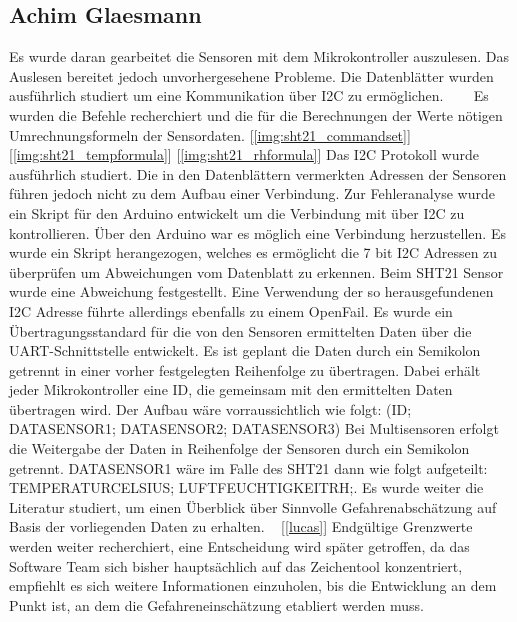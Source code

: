 \documentclass[]{article}
\begin{document}
\subsection{Achim Glaesmann}
Es wurde daran gearbeitet die Sensoren mit dem Mikrokontroller auszulesen. Das Auslesen bereitet jedoch unvorhergesehene Probleme. Die Datenblätter wurden ausführlich studiert um eine
Kommunikation über I2C zu ermöglichen. ~\cite{datasheetcss811}~\cite{datasheetscd41}~\cite{datasheetsht21} Es wurden die Befehle recherchiert und die für die Berechnungen der Werte nötigen Umrechnungsformeln der Sensordaten. {[\ref{img:sht21_commandset}]}  {[\ref{img:sht21_tempformula}]} {[\ref{img:sht21_rhformula}]} Das I2C Protokoll wurde ausführlich studiert. Die in den Datenblättern vermerkten Adressen der Sensoren führen jedoch nicht zu dem Aufbau einer 
Verbindung. Zur Fehleranalyse wurde ein Skript für den Arduino entwickelt um die Verbindung mit über I2C zu kontrollieren. Über den Arduino war es möglich eine Verbindung herzustellen.
Es wurde ein Skript herangezogen, welches es ermöglicht die 7 bit I2C Adressen zu überprüfen um Abweichungen vom Datenblatt zu erkennen. Beim SHT21 Sensor wurde eine Abweichung festgestellt.
Eine Verwendung der so herausgefundenen I2C Adresse führte allerdings ebenfalls zu einem OpenFail. Es wurde ein Übertragungsstandard für die von den Sensoren ermittelten Daten über
die UART-Schnittstelle entwickelt. Es ist geplant die Daten durch ein Semikolon getrennt in einer vorher festgelegten Reihenfolge zu übertragen. Dabei erhält jeder Mikrokontroller eine
ID, die gemeinsam mit den ermittelten Daten übertragen wird. Der Aufbau wäre vorraussichtlich wie folgt: (ID; DATASENSOR1; DATASENSOR2; DATASENSOR3) Bei Multisensoren erfolgt die Weitergabe
der Daten in Reihenfolge der Sensoren durch ein Semikolon getrennt. DATASENSOR1 wäre im Falle des SHT21 dann wie folgt aufgeteilt: TEMPERATURCELSIUS; LUFTFEUCHTIGKEITRH;. Es wurde weiter
die Literatur studiert, um einen Überblick über Sinnvolle Gefahrenabschätzung auf Basis der vorliegenden Daten zu erhalten. ~\cite{faktoren_luftquali} [\ref{lucas}] Endgültige Grenzwerte werden weiter recherchiert, 
eine Entscheidung wird später getroffen, da das Software Team sich bisher hauptsächlich auf das Zeichentool konzentriert, empfiehlt es sich weitere Informationen einzuholen, bis
die Entwicklung an dem Punkt ist, an dem die Gefahreneinschätzung etabliert werden muss.
\end{document}
